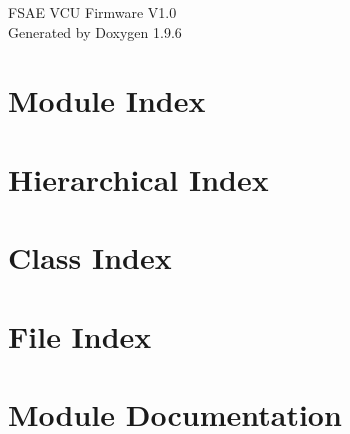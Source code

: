 \documentclass[twoside]{book}
\newcommand{\+}{\discretionary{\mbox{\scriptsize$\hookleftarrow$}}{}{}}
\newcommand{\clearemptydoublepage}{%
    \newpage{\pagestyle{empty}\cleardoublepage}%
  }
\begin{document}
  \raggedbottom
    \hypersetup{pageanchor=false,
                bookmarksnumbered=true,
                pdfencoding=unicode
               }
  \begin{titlepage}
  \vspace*{7cm}
  \begin{center}%
  {\Large FSAE VCU Firmware V1.\+0}\\
  \vspace*{1cm}
  {\large Generated by Doxygen 1.9.6}\\
  \end{center}
  \end{titlepage}
  \clearemptydoublepage
  \tableofcontents
  \clearemptydoublepage
  \hypersetup{pageanchor=true}
\chapter{Module Index}

\chapter{Hierarchical Index}

\chapter{Class Index}

\chapter{File Index}

\chapter{Module Documentation}


































\end{document}
